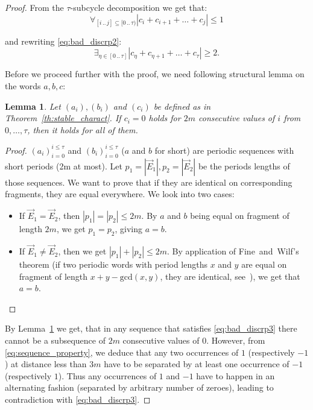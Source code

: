 \documentclass{article}[11pt,letter]
\newtheorem{lemma}[definition]{Lemma}
\newcommand{\closedrange}[2]{[#1\,..\,#2]}
\newcommand{\halfrange}[2]{[#1\,..\,#2)}
\begin{document}
\begin{proof}
From the $\tau$-subcycle decomposition we get that:
$$\forall_{\closedrange{i}{j} \subseteq \halfrange{0}{\tau}} |c_{i}+c_{i+1}+\ldots+c_{j}| \le 1$$

and rewriting \eqref{eq:bad_discrp2}:
\begin{equation}
\label{eq:bad_discrp3}
\exists_{\eta \in \closedrange{0}{\tau}} |c_\eta+ c_{\eta+1} + \ldots + c_{\tau}| \ge 2.
\end{equation}



Before we proceed further with the proof, we need following structural lemma on the words $a,b,c$:
\begin{lemma}
\label{lem:subwords}
Let $(a_i), (b_i)$ and $(c_i)$ be defined as in Theorem~\ref{th:stable_charact}.
If $c_i = 0$ holds for $2m$ consecutive values of $i$ from $0,\ldots,\tau$, then it holds for all of them.
\end{lemma}

\begin{proof}
$(a_i)_{i=0}^{i\le \tau}$ and $(b_i)_{i=0}^{i\le \tau}$ ($a$ and $b$ for short) are periodic sequences with short periods (2m at most).
Let $p_1=|\vec{E}_1|,p_2=|\vec{E}_2|$ be the periods lengths of those sequences.
We want to prove that if they are identical on corresponding fragments, they are equal everywhere.
We look into two cases:
\begin{itemize}
\item If $\vec{E}_1 = \vec{E}_2$, then $|p_1| = |p_2| \le 2m$. By $a$ and $b$ being equal on fragment of length $2m$, we get $p_1 = p_2$, giving $a=b$.
\item If $\vec{E}_1 \not= \vec{E}_2$, then we get $|p_1|+|p_2| \le 2m$. By application of Fine~and~Wilf’s theorem (if two periodic words with period lengths $x$ and $y$ are equal on fragment of length $x+y-\mathrm{gcd}(x,y)$, they are identical, see~\cite{FineWilf}), we get that $a=b$.
\end{itemize}

\end{proof}

By Lemma~\ref{lem:subwords} we get, that in any sequence that satisfies \eqref{eq:bad_discrp3} there cannot be a subsequence of $2m$ consecutive values of 0. However, from \eqref{eq:sequence_property}, we deduce that any two occurrences of $1$ (respectively $-1$) at distance less than $3m$ have to be separated by at least one occurrence of $-1$ (respectively $1$). Thus any occurrences of $1$ and $-1$ have to happen in an alternating fashion (separated by arbitrary number of zeroes), leading to contradiction with \eqref{eq:bad_discrp3}.

\end{proof}
\end{document}
